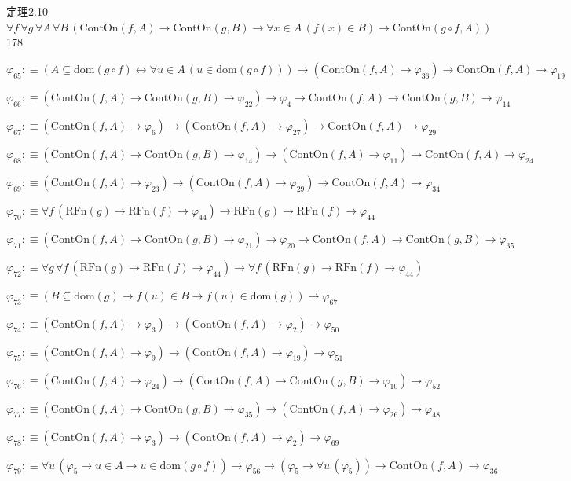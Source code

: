 \begin{fullproof}{定理2.10}{$\forall f\,\forall g\,\forall A\,\forall B\,(\mathrm{ContOn}(f,A) \to \mathrm{ContOn}(g,B) \to \forall x \in A\,(f(x) \in B) \to \mathrm{ContOn}(g \circ f,A))$}{178}
\begin{abbrevlist}
\item $\varphi_{65} :\equiv (A \subseteq \mathrm{dom}(g \circ f) \leftrightarrow \forall u \in A\,(u \in \mathrm{dom}(g \circ f))) \to (\mathrm{ContOn}(f,A) \to \varphi_{36}) \to \mathrm{ContOn}(f,A) \to \varphi_{19}$
\item $\varphi_{66} :\equiv (\mathrm{ContOn}(f,A) \to \mathrm{ContOn}(g,B) \to \varphi_{22}) \to \varphi_{4} \to \mathrm{ContOn}(f,A) \to \mathrm{ContOn}(g,B) \to \varphi_{14}$
\item $\varphi_{67} :\equiv (\mathrm{ContOn}(f,A) \to \varphi_{6}) \to (\mathrm{ContOn}(f,A) \to \varphi_{27}) \to \mathrm{ContOn}(f,A) \to \varphi_{29}$
\item $\varphi_{68} :\equiv (\mathrm{ContOn}(f,A) \to \mathrm{ContOn}(g,B) \to \varphi_{14}) \to (\mathrm{ContOn}(f,A) \to \varphi_{11}) \to \mathrm{ContOn}(f,A) \to \varphi_{24}$
\item $\varphi_{69} :\equiv (\mathrm{ContOn}(f,A) \to \varphi_{23}) \to (\mathrm{ContOn}(f,A) \to \varphi_{29}) \to \mathrm{ContOn}(f,A) \to \varphi_{34}$
\item $\varphi_{70} :\equiv \forall f\,(\mathrm{RFn}(g) \to \mathrm{RFn}(f) \to \varphi_{44}) \to \mathrm{RFn}(g) \to \mathrm{RFn}(f) \to \varphi_{44}$
\item $\varphi_{71} :\equiv (\mathrm{ContOn}(f,A) \to \mathrm{ContOn}(g,B) \to \varphi_{21}) \to \varphi_{20} \to \mathrm{ContOn}(f,A) \to \mathrm{ContOn}(g,B) \to \varphi_{35}$
\item $\varphi_{72} :\equiv \forall g\,\forall f\,(\mathrm{RFn}(g) \to \mathrm{RFn}(f) \to \varphi_{44}) \to \forall f\,(\mathrm{RFn}(g) \to \mathrm{RFn}(f) \to \varphi_{44})$
\item $\varphi_{73} :\equiv (B \subseteq \mathrm{dom}(g) \to f(u) \in B \to f(u) \in \mathrm{dom}(g)) \to \varphi_{67}$
\item $\varphi_{74} :\equiv (\mathrm{ContOn}(f,A) \to \varphi_{3}) \to (\mathrm{ContOn}(f,A) \to \varphi_{2}) \to \varphi_{50}$
\item $\varphi_{75} :\equiv (\mathrm{ContOn}(f,A) \to \varphi_{9}) \to (\mathrm{ContOn}(f,A) \to \varphi_{19}) \to \varphi_{51}$
\item $\varphi_{76} :\equiv (\mathrm{ContOn}(f,A) \to \varphi_{24}) \to (\mathrm{ContOn}(f,A) \to \mathrm{ContOn}(g,B) \to \varphi_{10}) \to \varphi_{52}$
\item $\varphi_{77} :\equiv (\mathrm{ContOn}(f,A) \to \mathrm{ContOn}(g,B) \to \varphi_{35}) \to (\mathrm{ContOn}(f,A) \to \varphi_{26}) \to \varphi_{48}$
\item $\varphi_{78} :\equiv (\mathrm{ContOn}(f,A) \to \varphi_{3}) \to (\mathrm{ContOn}(f,A) \to \varphi_{2}) \to \varphi_{69}$
\item $\varphi_{79} :\equiv \forall u\,(\varphi_{5} \to u \in A \to u \in \mathrm{dom}(g \circ f)) \to \varphi_{56} \to (\varphi_{5} \to \forall u\,(\varphi_{5})) \to \mathrm{ContOn}(f,A) \to \varphi_{36}$
\end{abbrevlist}
\end{fullproof}
